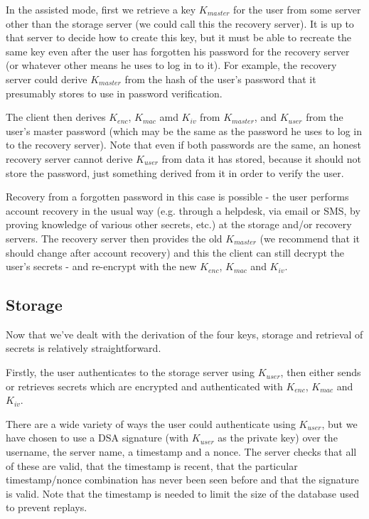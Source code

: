 \documentclass[a4paper,titlepage]{article}
\begin{document}
In the assisted mode, first we retrieve a key $K_{master}$ for the
user from some server other than the storage server (we could call
this the recovery server). It is up to that server to decide how to
create this key, but it must be able to recreate the same key even
after the user has forgotten his password for the recovery server (or
whatever other means he uses to log in to it). For example, the
recovery server could derive $K_{master}$ from the hash of the user's
password that it presumably stores to use in password verification.

The client then derives $K_{enc}$, $K_{mac}$ amd $K_{iv}$ from $K_{master}$, and
$K_{user}$ from the user's master password (which may be the same as
the password he uses to log in to the recovery server). Note that even
if both passwords are the same, an honest recovery server cannot
derive $K_{user}$ from data it has stored, because it should not store
the password, just something derived from it in order to verify the
user.

Recovery from a forgotten password in this case is possible - the user
performs account recovery in the usual way (e.g. through a helpdesk,
via email or SMS, by proving knowledge of various other secrets, etc.)
at the storage and/or recovery servers. The recovery server then
provides the old $K_{master}$ (we recommend that it should change
after account recovery) and this the client can still decrypt the
user's secrets - and re-encrypt with the new $K_{enc}$, $K_{mac}$ and $K_{iv}$.

\subsection{Storage}

Now that we've dealt with the derivation of the four keys, storage
and retrieval of secrets is relatively straightforward.

Firstly, the user authenticates to the storage server using
$K_{user}$, then either sends or retrieves secrets which are encrypted
and authenticated with $K_{enc}$, $K_{mac}$ and $K_{iv}$.

There are a wide variety of ways the user could authenticate using
$K_{user}$, but we have chosen to use a DSA signature (with $K_{user}$
as the private key) over the username, the server name, a timestamp
and a nonce. The server checks that all of these are valid, that the
timestamp is recent, that the particular timestamp/nonce combination
has never been seen before and that the signature is valid. Note that
the timestamp is needed to limit the size of the database used to
prevent replays.
\end{document}
